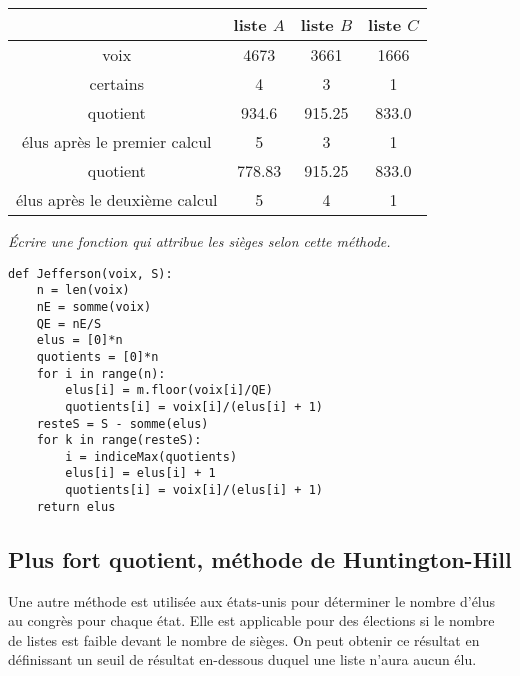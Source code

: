 \begin{center}
\begin{tabular}{c|ccc}
                             & liste $A$ & liste $B$ & liste $C$ \\
\hline
voix                         & 4673      & 3661      & 1666      \\
certains                     &  4        & 3         &   1       \\
\hline
quotient                     &  934.6    & 915.25    &  833.0    \\
élus après le premier calcul &  5        & 3         &  1        \\
quotient                     &  778.83   &  915.25   &  833.0    \\
élus après le deuxième calcul&  5        & 4         &  1        \\
\end{tabular}
\end{center}
\begin{Exercise}\it
Écrire une fonction  qui attribue les sièges selon cette méthode.
\end{Exercise}
\begin{Answer}
\begin{lstlisting}
def Jefferson(voix, S):
    n = len(voix)
    nE = somme(voix)
    QE = nE/S
    elus = [0]*n
    quotients = [0]*n
    for i in range(n):
        elus[i] = m.floor(voix[i]/QE)
        quotients[i] = voix[i]/(elus[i] + 1)
    resteS = S - somme(elus)
    for k in range(resteS):
        i = indiceMax(quotients)
        elus[i] = elus[i] + 1
        quotients[i] = voix[i]/(elus[i] + 1)
    return elus
\end{lstlisting}
\end{Answer}
\subsection{Plus fort quotient, méthode de Huntington-Hill}
Une autre méthode est utilisée aux états-unis pour déterminer le nombre d'élus au congrès pour chaque état. Elle est applicable pour des élections si le nombre de listes est faible devant le nombre de sièges. On peut obtenir ce résultat en définissant un seuil de résultat en-dessous duquel une liste n'aura aucun élu.

